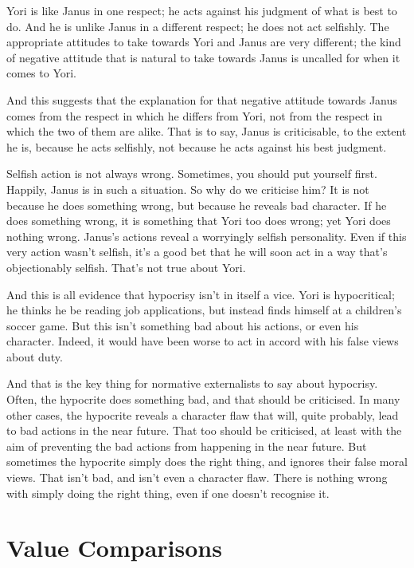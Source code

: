 \gls{Yori} is like \gls{Janus} in one respect; he acts against his judgment of what is best to do. And he is unlike \gls{Janus} in a different respect; he does not act selfishly. The appropriate attitudes to take towards \gls{Yori} and \gls{Janus} are very different; the kind of negative attitude that is natural to take towards \gls{Janus} is uncalled for when it comes to \gls{Yori}.

And this suggests that the explanation for that negative attitude towards \gls{Janus} comes from the respect in which he differs from \gls{Yori}, not from the respect in which the two of them are alike. That is to say, \gls{Janus} is criticisable, to the extent he is, because he acts selfishly, not because he acts against his best judgment.

Selfish action is not always wrong. Sometimes, you should put yourself first. Happily, \gls{Janus} is in such a situation. So why do we criticise him? It is not because he does something wrong, but because he reveals bad character. If he does something wrong, it is something that \gls{Yori} too does wrong; yet \gls{Yori} does nothing wrong. \gls{Janus}'s actions reveal a worryingly selfish personality. Even if this very action wasn't selfish, it's a good bet that he will soon act in a way that's objectionably selfish. That's not true about \gls{Yori}.

And this is all evidence that hypocrisy isn't in itself a vice. \gls{Yori} is hypocritical; he thinks he be reading job applications, but instead finds himself at a children's soccer game. But this isn't something bad about his actions, or even his character. Indeed, it would have been worse to act in accord with his false views about duty.

And that is the key thing for normative externalists to say about hypocrisy. Often, the hypocrite does something bad, and that should be criticised. In many other cases, the hypocrite reveals a character flaw that will, quite probably, lead to bad actions in the near future. That too should be criticised, at least with the aim of preventing the bad actions from happening in the near future. But sometimes the hypocrite simply does the right thing, and ignores their false moral views. That isn't bad, and isn't even a character flaw. There is nothing wrong with simply doing the right thing, even if one doesn't recognise it.

\section{Value Comparisons}
\label{valuecomparisons}

